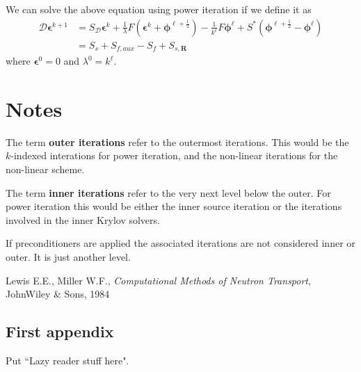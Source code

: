 \documentclass[11pt,letterpaper,notitlepage]{article}
\newcommand{\beqn}{\begin{equation}
		\begin{aligned}}
\newcommand{\eeqn}{\end{aligned}
\end{equation}}
\numberwithin{equation}{section}
\newcommand{\bphi}{\boldsymbol{\phi}}
\newcommand{\half}{\frac{1}{2}}
\newcommand{\bepsilon}{\boldsymbol{\epsilon}}
\begin{document}
We can solve the above equation using power iteration if we define it as
\beqn 
\mathcal{D} \bepsilon^{k+1} &= S_{\mathcal{D}} \bepsilon^k +  \frac{1}{\lambda}F(\bepsilon^k + \bphi^{\ell+\half}) - \frac{1}{k^{\ell}} F\bphi^{\ell} + S^*(\bphi^{\ell+\half} - \bphi^{\ell}) \\
&= S_s + S_{f,aux} - S_f + S_{s,\mathbf{R}}
\eeqn
where $\bepsilon^0 = 0$ and $\lambda^0 = k^\ell$.


\newpage
\section{Notes}
The term \textbf{outer iterations} refer to the outermost iterations. This would be the $k$-indexed interations for power iteration, and the non-linear iterations for the non-linear scheme.

The term \textbf{inner iterations} refer to the very next level below the outer. For power iteration this would be either the inner source iteration or the iterations involved in the inner Krylov solvers. 

If preconditioners are applied the associated iterations are not considered inner or outer. It is just another level.







\newpage
\begin{thebibliography}{1}
	
	 Lewis E.E., Miller W.F., {\em Computational Methods of Neutron Transport}, JohnWiley \& Sons, 1984
	   
\end{thebibliography}

\newpage
\begin{appendices}
\section{First appendix}
Put ``Lazy reader stuff here".
\end{appendices}
\end{document}
